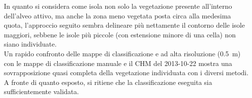 \begin{description}
	In quanto si considera come isola non solo la vegetazione presente all'interno dell'alveo attivo, ma anche la zona meno vegetata posta circa alla medesima quota, l'approccio seguito sembra delineare più nettamente il contorno delle isole maggiori, sebbene le isole più piccole (con estensione minore di una cella) non siano individuate.
	\\
	Un rapido confronto delle mappe di classificazione \Pl{} e \WV{} ad alta risoluzione (\SI{0.5}{\m}) con le mappe di classificazione manuale e il CHM del 2013-10-22 mostra una sovrapposizione quasi completa della vegetazione individuata con i diversi metodi.
	\\
	A fronte di quanto esposto, si ritiene che la classificazione eseguita sia sufficientemente validata.
\end{description}

